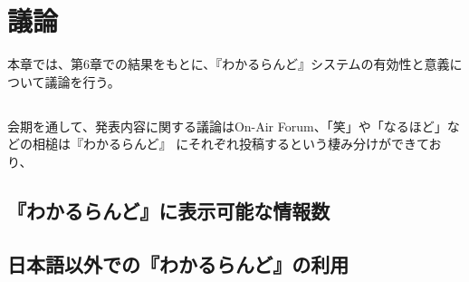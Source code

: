 \chapter{議論}
\label{chap:discussion}

本章では、第6章での結果をもとに、『わかるらんど』システムの有効性と意義について議論を行う。

\newpage

\section{}

会期を通して、発表内容に関する議論はOn-Air Forum、「笑」や「なるほど」などの相槌は『わかるらんど』
にそれぞれ投稿するという棲み分けができており、


\section{『わかるらんど』に表示可能な情報数}


\section{日本語以外での『わかるらんど』の利用}